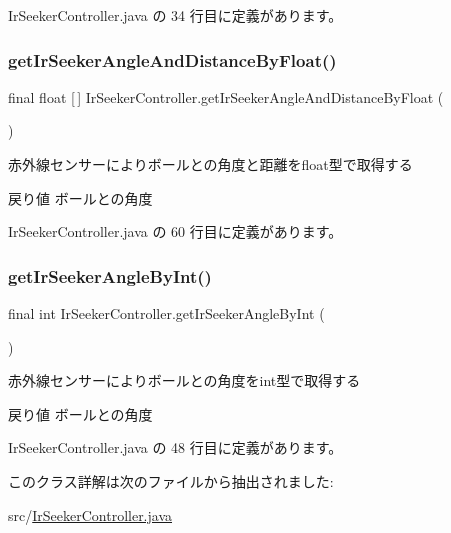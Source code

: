  Ir\+Seeker\+Controller.\+java の 34 行目に定義があります。

\mbox{\label{class_ir_seeker_controller_a554c0174b99e64201156d05434781bb3}} 
\subsubsection{\texorpdfstring{getIrSeekerAngleAndDistanceByFloat()}{getIrSeekerAngleAndDistanceByFloat()}}
{\footnotesize\ttfamily final float \mbox{[}$\,$\mbox{]} Ir\+Seeker\+Controller.\+get\+Ir\+Seeker\+Angle\+And\+Distance\+By\+Float (\begin{DoxyParamCaption}{ }\end{DoxyParamCaption})\hspace{0.3cm}{\ttfamily [inline]}}

赤外線センサーによりボールとの角度と距離をfloat型で取得する \begin{DoxyReturn}{戻り値}
ボールとの角度 
\end{DoxyReturn}


 Ir\+Seeker\+Controller.\+java の 60 行目に定義があります。

\mbox{\label{class_ir_seeker_controller_ae8eeef8c000dbea552f843f8b97630e7}} 
\subsubsection{\texorpdfstring{getIrSeekerAngleByInt()}{getIrSeekerAngleByInt()}}
{\footnotesize\ttfamily final int Ir\+Seeker\+Controller.\+get\+Ir\+Seeker\+Angle\+By\+Int (\begin{DoxyParamCaption}{ }\end{DoxyParamCaption})\hspace{0.3cm}{\ttfamily [inline]}}

赤外線センサーによりボールとの角度をint型で取得する \begin{DoxyReturn}{戻り値}
ボールとの角度 
\end{DoxyReturn}


 Ir\+Seeker\+Controller.\+java の 48 行目に定義があります。



このクラス詳解は次のファイルから抽出されました\+:\begin{DoxyCompactItemize}
\item 
src/\mbox{\hyperlink{_ir_seeker_controller_8java}{Ir\+Seeker\+Controller.\+java}}\end{DoxyCompactItemize}
